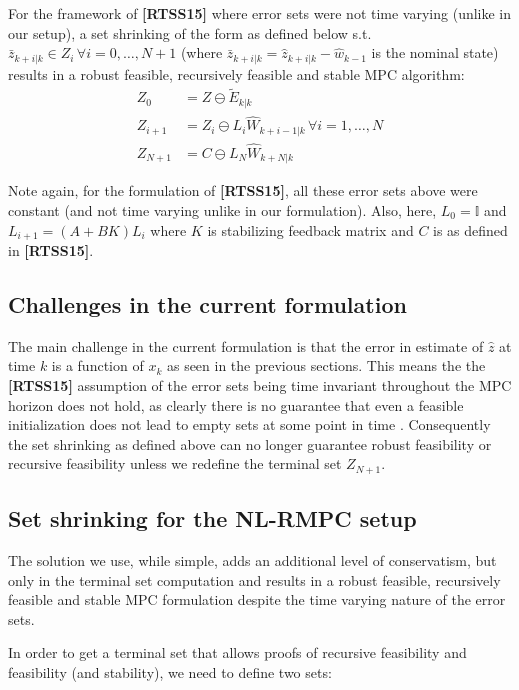 \documentclass{article}[14pt]
\begin{document}
For the framework of \textbf{[RTSS15]} where error sets were not time varying (unlike in our setup), a set shrinking of the form as defined below s.t. $\bar{z}_{k+i|k}\in Z_{i}\,\forall i=0,\dotsc,N+1$ (where $\bar{z}_{k+i|k}=\hat{z}_{k+i|k}-\hat{w}_{k-1}$ is the nominal state) results in a robust feasible, recursively feasible and stable MPC algorithm:
\begin{subequations}
\label{eq:set_RTSS}
\begin{align}
Z_0&=Z\ominus\tilde{E}_{k|k} \\
Z_{i+1}&=Z_i\ominus L_i\hat{W}_{k+i-1|k}\,\forall i=1,\dotsc,N \\
Z_{N+1}&=C\ominus L_N\hat{W}_{k+N|k}
\end{align}
\end{subequations}

Note again, for the formulation of \textbf{[RTSS15]}, all these error sets above were constant (and not time varying unlike in our formulation). Also, here, $L_0=\mathbb{I}$ and $L_{i+1}=(A+BK)L_i$ where $K$ is stabilizing feedback matrix and $C$ is as defined in \textbf{[RTSS15]}.

\subsection{Challenges in the current formulation}
The main challenge in the current formulation is that the error in estimate of $\hat{z}$ at time $k$ is a function of $x_k$ as seen in the previous sections. This means the the \textbf{[RTSS15]} assumption of the error sets being time invariant throughout the MPC horizon does not hold, as clearly there is no guarantee that even a feasible initialization does not lead to empty sets at some point in time . Consequently the set shrinking as defined above can no longer guarantee robust feasibility or recursive feasibility unless we redefine the terminal set $Z_{N+1}$.

\subsection{Set shrinking for the NL-RMPC setup}
The solution we use, while simple, adds an additional level of conservatism, but only in the terminal set computation and results in a robust feasible, recursively feasible and stable MPC formulation despite the time varying nature of the error sets. 

In order to get a terminal set that allows proofs of recursive feasibility and feasibility (and stability), we need to define two sets:
\end{document}
